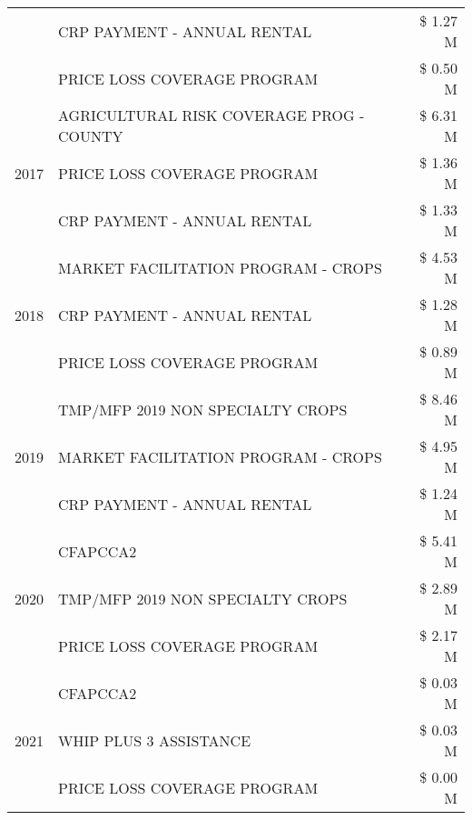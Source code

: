 \begin{tabular}{llr}
 & CRP PAYMENT - ANNUAL RENTAL                   & \$ 1.27 M \\
 & PRICE LOSS COVERAGE PROGRAM                   & \$ 0.50 M \\
\cline{1-3}
\multirow[t]{3}{*}{2017} & AGRICULTURAL RISK COVERAGE PROG - COUNTY & \$ 6.31 M \\
 & PRICE LOSS COVERAGE PROGRAM & \$ 1.36 M \\
 & CRP PAYMENT - ANNUAL RENTAL & \$ 1.33 M \\
\cline{1-3}
\multirow[t]{3}{*}{2018} & MARKET FACILITATION PROGRAM - CROPS & \$ 4.53 M \\
 & CRP PAYMENT - ANNUAL RENTAL & \$ 1.28 M \\
 & PRICE LOSS COVERAGE PROGRAM & \$ 0.89 M \\
\cline{1-3}
\multirow[t]{3}{*}{2019} & TMP/MFP 2019 NON SPECIALTY CROPS & \$ 8.46 M \\
 & MARKET FACILITATION PROGRAM - CROPS & \$ 4.95 M \\
 & CRP PAYMENT - ANNUAL RENTAL & \$ 1.24 M \\
\cline{1-3}
\multirow[t]{3}{*}{2020} & CFAPCCA2 & \$ 5.41 M \\
 & TMP/MFP 2019 NON SPECIALTY CROPS & \$ 2.89 M \\
 & PRICE LOSS COVERAGE PROGRAM & \$ 2.17 M \\
\cline{1-3}
\multirow[t]{3}{*}{2021} & CFAPCCA2 & \$ 0.03 M \\
 & WHIP PLUS 3 ASSISTANCE & \$ 0.03 M \\
 & PRICE LOSS COVERAGE PROGRAM & \$ 0.00 M \\
\cline{1-3}
\bottomrule
\end{tabular}
